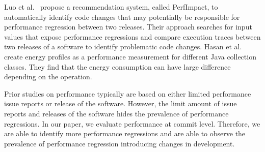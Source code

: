 Luo et al.~\cite{ACM2016:Luo} propose a recommendation system, called PerfImpact, to automatically identify code changes that may potentially be responsible for performance regression between two releases. Their approach searches for input values that expose performance regressions and compare execution traces between two releases of a software to identify problematic code changes. Hasan et al.~\cite{Hasan:icse2016} create energy profiles as a performance measurement for different Java collection classes. They find that the energy consumption can have large difference depending on the operation.

Prior studies on performance typically are based on either limited performance issue reports or release of the software. However, the limit amount of issue reports and releases of the software hides the prevalence of performance regressions. In our paper, we evaluate performance at commit level. Therefore, we are able to identify more performance regressions and are able to observe the prevalence of performance regression introducing changes in development. 
